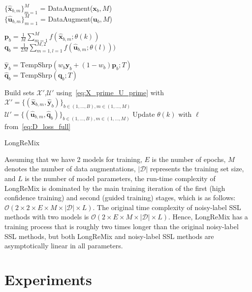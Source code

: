 \documentclass[review]{elsarticle}
\begin{document}
\begin{algorithm}[t!]
{{{           
        {
            $\{ \hat{\mathbf{x}}_{b,m}\}_{m=1}^{M}$ = DataAugment($\mathbf{x}_b,M$)\\
            $\{ \hat{\mathbf{u}}_{b,m} \}_{m=1}^{M}$ = DataAugment($\mathbf{u}_b,M$)
                
            $\mathbf{p}_b =  \frac{1}{M}\sum\limits_{m=1}^{M}
            f(\hat{\mathbf{x}}_{b,m};\theta(k))$\\
            $\mathbf{q}_b = \frac{1}{2M}\sum\limits_{m=1,l=1}^{M,2} f(\hat{\mathbf{u}}_{b,m};\theta(l)))$
            
            $\hat{\mathbf{y}}_b = \text{TempShrp}(w_b \mathbf{y}_b + (1-w_b)\mathbf{p}_b;T)$\\
            $\hat{\mathbf{q}}_b = \text{TempShrp}(\mathbf{q}_b;T)$
            
        }
        Build sets $\mathcal{X}'$,$\mathcal{U}'$
        using~\eqref{eq:X_prime_U_prime} with $\mathcal{X}'=\{(\hat{\mathbf{x}}_{b,m},\hat{\mathbf{y}}_b)\}_{b \in (1,...,B), m \in (1,...,M)}$ 
        $\mathcal{U}'=\{(\hat{\mathbf{u}}_{b,m},\hat{\mathbf{q}}_b) \}_{b \in (1,...,B), m \in (1,...,M)}$
        Update $\theta(k)$ with $\ell$ from~\eqref{eq:D_loss_full}
        
    }
    }
 }
 \caption{LongReMix}
 \label{alg:LRM}
 
\end{algorithm}


Assuming that we have 2 models for training, $E$ is the number of epochs, $M$ denotes the number of data augmentations, $|\mathcal{D}|$ represents the training set size, and $L$ is the number of model parameters, 
the run-time complexity of LongReMix is dominated by the main training iteration of the first (high confidence training) and second (guided training) stages, which is as follows: $\mathcal{O}(2 \times 2 \times E \times M \times |\mathcal{D}| \times L)$. The original time complexity of noisy-label SSL methods with two models is $\mathcal{O}(2 \times E \times M \times |\mathcal{D}| \times L)$. Hence, LongReMix has a training process that is roughly two times longer than the original noisy-label SSL methods, but both LongReMix and noisy-label SSL methods are asymptotically linear in all parameters.


\section{Experiments}\label{sec:experiments}
\end{document}
